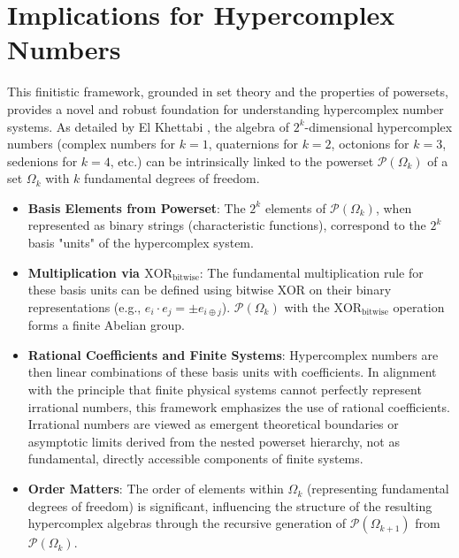 \documentclass[11pt,a4paper]{article}
\begin{document}
\section{Implications for Hypercomplex Numbers}

This finitistic framework, grounded in set theory and the properties of powersets, provides a novel and robust foundation for understanding hypercomplex number systems. As detailed by El Khettabi \cite{ElKhettabi2024HCN}, the algebra of $2^k$-dimensional hypercomplex numbers (complex numbers for $k=1$, quaternions for $k=2$, octonions for $k=3$, sedenions for $k=4$, etc.) can be intrinsically linked to the powerset $\mathcal{P}(\Omega_k)$ of a set $\Omega_k$ with $k$ fundamental degrees of freedom.

\begin{itemize}
    \item \textbf{Basis Elements from Powerset}: The $2^k$ elements of $\mathcal{P}(\Omega_k)$, when represented as binary strings (characteristic functions), correspond to the $2^k$ basis "units" of the hypercomplex system.
    \item \textbf{Multiplication via $\text{XOR}_{\text{bitwise}}$}: The fundamental multiplication rule for these basis units can be defined using bitwise XOR on their binary representations (e.g., $e_i \cdot e_j = \pm e_{i \oplus j}$). $\mathcal{P}(\Omega_k)$ with the $\text{XOR}_{\text{bitwise}}$ operation forms a finite Abelian group.
    \item \textbf{Rational Coefficients and Finite Systems}: Hypercomplex numbers are then linear combinations of these basis units with coefficients. In alignment with the principle that finite physical systems cannot perfectly represent irrational numbers, this framework emphasizes the use of rational coefficients. Irrational numbers are viewed as emergent theoretical boundaries or asymptotic limits derived from the nested powerset hierarchy, not as fundamental, directly accessible components of finite systems.
    \item \textbf{Order Matters}: The order of elements within $\Omega_k$ (representing fundamental degrees of freedom) is significant, influencing the structure of the resulting hypercomplex algebras through the recursive generation of $\mathcal{P}(\Omega_{k+1})$ from $\mathcal{P}(\Omega_k)$.
\end{itemize}
\end{document}
